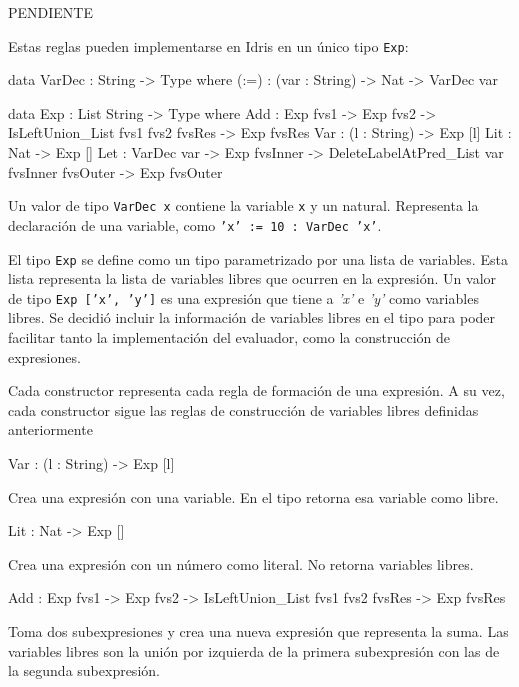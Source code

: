 PENDIENTE

Estas reglas pueden implementarse en Idris en un único tipo \texttt{Exp}:

\begin{code}
data VarDec : String -> Type where
  (:=) : (var : String) -> Nat -> VarDec var

data Exp : List String -> Type where
  Add : Exp fvs1 -> Exp fvs2 -> 
    IsLeftUnion_List fvs1 fvs2 fvsRes -> 
    Exp fvsRes 
  Var : (l : String) -> Exp [l]
  Lit : Nat -> Exp []
  Let : VarDec var -> Exp fvsInner -> 
    DeleteLabelAtPred_List var fvsInner fvsOuter -> 
    Exp fvsOuter
\end{code}

Un valor de tipo \texttt{VarDec x} contiene la variable \texttt{x} y un natural. Representa la declaración de una variable, como \texttt{'x' := 10 : VarDec 'x'}.

El tipo \texttt{Exp} se define como un tipo parametrizado por una lista de variables. Esta lista representa la lista de variables libres que ocurren en la expresión. Un valor de tipo \texttt{Exp ['x', 'y']} es una expresión que tiene a \textit{'x'} e \textit{'y'} como variables libres. Se decidió incluir la información de variables libres en el tipo para poder facilitar tanto la implementación del evaluador, como la construcción de expresiones.

Cada constructor representa cada regla de formación de una expresión. A su vez, cada constructor sigue las reglas de construcción de variables libres definidas anteriormente

\begin{code}
Var : (l : String) -> Exp [l]
\end{code}

Crea una expresión con una variable. En el tipo retorna esa variable como libre.

\begin{code}
Lit : Nat -> Exp []
\end{code}

Crea una expresión con un número como literal. No retorna variables libres.

\begin{code}
Add : Exp fvs1 -> Exp fvs2 -> 
    IsLeftUnion_List fvs1 fvs2 fvsRes -> 
    Exp fvsRes
\end{code}

Toma dos subexpresiones y crea una nueva expresión que representa la suma. Las variables libres son la unión por izquierda de la primera subexpresión con las de la segunda subexpresión.

